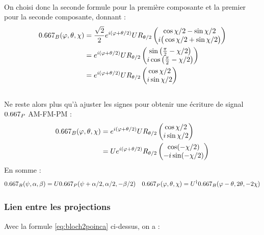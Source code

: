 \\
On choisi donc la seconde formule pour la première composante et la premier pour la seconde composante, donnant :
\begin{align*}
	\x_B(\varphi, \theta, \chi) &= \frac{\sqrt{2}}{2}e^{i(\varphi + \theta/2)}U R_{\theta/2} \begin{pmatrix} 
		\cos \chi/2 - \sin\chi/2 \\ 
		i\big(\cos\chi/2 + \sin\chi/2\big)
	\end{pmatrix} \\
	&= e^{i(\varphi + \theta/2)}U R_{\theta/2} \begin{pmatrix} 
		\sin\left( \frac{\pi}{2} - \chi/2\right) \\ 
		i\cos\left( \frac{\pi}{2} - \chi/2\right)
	\end{pmatrix} \\
	&= e^{i(\varphi + \theta/2)}U R_{\theta/2} \begin{pmatrix} 
		\cos \chi/2 \\ 
		i\sin \chi/2
	\end{pmatrix}
\end{align*}
\\
Ne reste alors plus qu'à ajuster les signes pour obtenir une écriture de signal $\x_P$ AM-FM-PM :
\begin{align*}
	\x_B(\varphi, \theta, \chi) &= e^{i(\varphi + \theta/2)}U R_{\theta/2} \begin{pmatrix} 
		\cos \chi/2 \\ 
		i\sin \chi/2
	\end{pmatrix} \\
	&= U e^{i(\varphi + \theta/2)} R_{\theta/2} \begin{pmatrix} 
		\cos (-\chi/2) \\ 
		-i\sin (-\chi/2)
	\end{pmatrix}
\end{align*}
En somme :
\begin{align} \label{eq:bloch2poinca}
	\x_B(\psi, \alpha, \beta) &= U \x_P(\psi + \alpha/2, \alpha/2, -\beta/2)  & 
	\x_P(\varphi, \theta, \chi) = U^\dagger 	\x_B(\varphi-\theta, 2\theta, -2\chi)	
\end{align}
\skipl 



\subsubsection{Lien entre les projections}

Avec la formule \eqref{eq:bloch2poinca} ci-dessus, on a :


